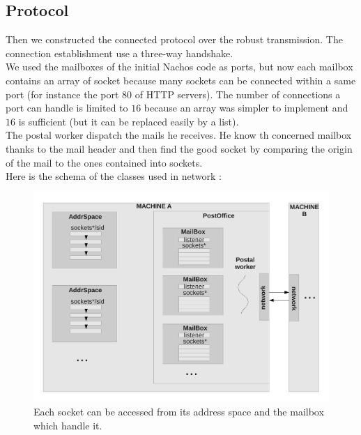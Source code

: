 \subsection{Protocol}
Then we constructed the connected protocol over the robust transmission.
The connection establishment use a three-way handshake.\\
We used the mailboxes of the initial Nachos code as ports, but now each mailbox contains an array of 
socket because many sockets can be connected within a same port (for instance the
port $80$ of HTTP servers).  The number of connections a port can handle is limited 
to $16$ because an array was simpler to implement and $16$ is sufficient (but it 
can be replaced easily by a list).\\
The postal worker dispatch the mails he receives. He know th concerned mailbox
thanks to the mail header and then find the good socket by comparing the origin
of the mail to the ones contained into sockets.\\
Here is the schema of the classes used in network :
\begin{figure}[H]
	\centering
		\includegraphics[scale=0.4]{networkschema}
		\caption{Each socket can be accessed from its address space and the mailbox which handle it.}
\end{figure}
